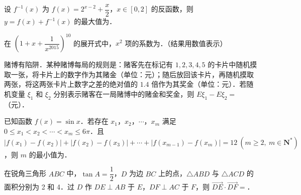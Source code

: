 \begin{question}
设 \(f^{-1}(x)\) 为 \(f(x)=2^{x-2}+\dfrac{x}{2}\)，\(x\in[0,2]\) 的反函数，则 \(y=f(x)+f^{-1}(x)\) 的最大值为\gkblank{}．

\end{question}
\begin{question}
在 \(\left(1+x+\dfrac{1}{x^{2015}}\right)^{10}\) 的展开式中，\(x^{2}\) 项的系数为\gkblank{}．（结果用数值表示）

\end{question}
\begin{question}
赌博有陷阱．某种赌博每局的规则是：赌客先在标记有 \(1,2,3,4,5\) 的卡片中随机摸取一张，将卡片上的数字作为其赌金（单位：元）；随后放回该卡片，再随机摸取两张，将这两张卡片上数字之差的绝对值的 \(1.4\) 倍作为其奖金（单位：元）．若随机变量 \(\xi_{1}\) 和 \(\xi_{2}\) 分别表示赌客在一局赌博中的赌金和奖金，则 \(E\xi_{1}-E\xi_{2}=\)\gkblank{}（元）．

\end{question}
\begin{question}
已知函数 \(f(x)=\sin x\)．若存在 \(x_{1}\)，\(x_{2}\)，\(\cdots\)，\(x_{m}\) 满足 \(0\leqslant x_{1}<x_{2}<\cdots<x_{m}\leqslant 6\pi\)．且 \(|f(x_{1})-f(x_{2})|+|f(x_{2})-f(x_{3})|+\cdots+|f(x_{m-1})-f(x_{m})|=12\ (m\geqslant 2,\ m\in\mathbf{N}^{*})\)，则 \(m\) 的最小值为\gkblank{}．

\end{question}
\begin{question}
在锐角三角形 \(ABC\) 中，\(\tan A=\dfrac{1}{2}\)，\(D\) 为边 \(BC\) 上的点，\(\triangle ABD\) 与 \(\triangle ACD\) 的面积分别为 2 和 4．过 \(D\) 作 \(DE\perp AB\) 于 \(E\)，\(DF\perp AC\) 于 \(F\)，则 \(\overrightarrow{DE}\cdot\overrightarrow{DF}=\)\gkblank{}．

\end{question}

